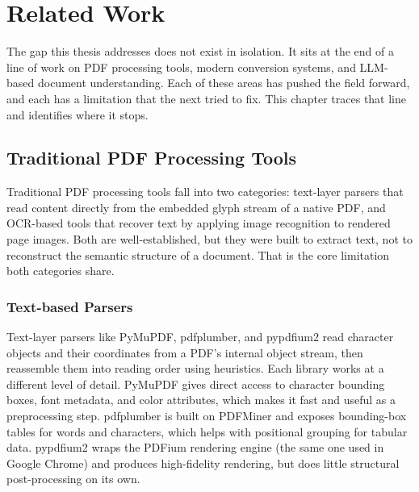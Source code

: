 \chapter{Related Work}

The gap this thesis addresses does not exist in isolation. It sits at the end
of a line of work on PDF processing tools, modern conversion systems, and
LLM-based document understanding. Each of these areas has pushed the field
forward, and each has a limitation that the next tried to fix. This chapter
traces that line and identifies where it stops.

\section{Traditional PDF Processing Tools}

Traditional PDF processing tools fall into two categories: text-layer parsers
that read content directly from the embedded glyph stream of a native PDF, and
OCR-based tools that recover text by applying image recognition to rendered
page images. Both are well-established, but they were built to extract text,
not to reconstruct the semantic structure of a document. That is the core
limitation both categories share.

\subsection{Text-based Parsers}

Text-layer parsers like PyMuPDF, pdfplumber, and pypdfium2 read character
objects and their coordinates from a PDF's internal object stream, then
reassemble them into reading order using heuristics. Each library works at a
different level of detail. PyMuPDF gives direct access to character bounding
boxes, font metadata, and color attributes, which makes it fast and useful as
a preprocessing step. pdfplumber is built on PDFMiner and exposes bounding-box
tables for words and characters, which helps with positional grouping for
tabular data. pypdfium2 wraps the PDFium rendering engine (the same one
used in Google Chrome) and produces high-fidelity rendering, but does
little structural post-processing on its own.

